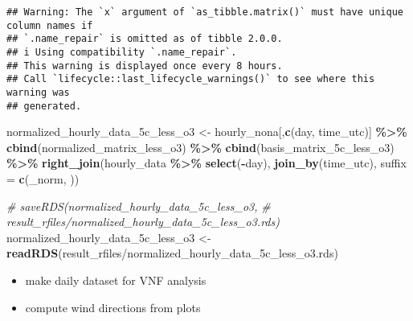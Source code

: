 \documentclass[
]{article}
\newenvironment{Shaded}{\begin{snugshade}}{\end{snugshade}}
\newcommand{\AttributeTok}[1]{\textcolor[rgb]{0.13,0.29,0.53}{#1}}
\newcommand{\CommentTok}[1]{\textcolor[rgb]{0.56,0.35,0.01}{\textit{#1}}}
\newcommand{\FunctionTok}[1]{\textcolor[rgb]{0.13,0.29,0.53}{\textbf{#1}}}
\newcommand{\NormalTok}[1]{#1}
\newcommand{\OtherTok}[1]{\textcolor[rgb]{0.56,0.35,0.01}{#1}}
\newcommand{\SpecialCharTok}[1]{\textcolor[rgb]{0.81,0.36,0.00}{\textbf{#1}}}
\newcommand{\StringTok}[1]{\textcolor[rgb]{0.31,0.60,0.02}{#1}}
\providecommand{\tightlist}{%
  \setlength{\itemsep}{0pt}\setlength{\parskip}{0pt}}
\begin{document}
\begin{verbatim}
## Warning: The `x` argument of `as_tibble.matrix()` must have unique column names if
## `.name_repair` is omitted as of tibble 2.0.0.
## i Using compatibility `.name_repair`.
## This warning is displayed once every 8 hours.
## Call `lifecycle::last_lifecycle_warnings()` to see where this warning was
## generated.
\end{verbatim}

\begin{Shaded}
\begin{Highlighting}[]
\NormalTok{normalized\_hourly\_data\_5c\_less\_o3 }\OtherTok{\textless{}{-}}\NormalTok{ hourly\_nona[,}\FunctionTok{c}\NormalTok{(}\StringTok{\textquotesingle{}day\textquotesingle{}}\NormalTok{, }\StringTok{\textquotesingle{}time\_utc\textquotesingle{}}\NormalTok{)] }\SpecialCharTok{\%\textgreater{}\%}
  \FunctionTok{cbind}\NormalTok{(normalized\_matrix\_less\_o3) }\SpecialCharTok{\%\textgreater{}\%}
  \FunctionTok{cbind}\NormalTok{(basis\_matrix\_5c\_less\_o3) }\SpecialCharTok{\%\textgreater{}\%}
  \FunctionTok{right\_join}\NormalTok{(hourly\_data }\SpecialCharTok{\%\textgreater{}\%} \FunctionTok{select}\NormalTok{(}\SpecialCharTok{{-}}\StringTok{\textquotesingle{}day\textquotesingle{}}\NormalTok{), }\FunctionTok{join\_by}\NormalTok{(time\_utc), }\AttributeTok{suffix =} \FunctionTok{c}\NormalTok{(}\StringTok{\textquotesingle{}\_norm\textquotesingle{}}\NormalTok{, }\StringTok{\textquotesingle{}\textquotesingle{}}\NormalTok{))}

\CommentTok{\# saveRDS(normalized\_hourly\_data\_5c\_less\_o3, }
\CommentTok{\#  \textquotesingle{}result\_rfiles/normalized\_hourly\_data\_5c\_less\_o3.rds\textquotesingle{})}
\NormalTok{normalized\_hourly\_data\_5c\_less\_o3 }\OtherTok{\textless{}{-}} \FunctionTok{readRDS}\NormalTok{(}\StringTok{\textquotesingle{}result\_rfiles/normalized\_hourly\_data\_5c\_less\_o3.rds\textquotesingle{}}\NormalTok{)}
\end{Highlighting}
\end{Shaded}

\begin{itemize}
\tightlist
\item
  make daily dataset for VNF analysis
\item
  compute wind directions from plots
\end{itemize}
\end{document}
